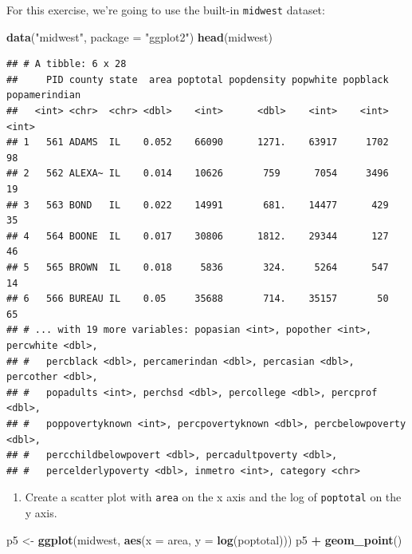 \documentclass[
]{book}
\newenvironment{Shaded}{\begin{snugshade}}{\end{snugshade}}
\newcommand{\DataTypeTok}[1]{\textcolor[rgb]{0.13,0.29,0.53}{#1}}
\newcommand{\KeywordTok}[1]{\textcolor[rgb]{0.13,0.29,0.53}{\textbf{#1}}}
\newcommand{\NormalTok}[1]{#1}
\newcommand{\OperatorTok}[1]{\textcolor[rgb]{0.81,0.36,0.00}{\textbf{#1}}}
\newcommand{\StringTok}[1]{\textcolor[rgb]{0.31,0.60,0.02}{#1}}
\providecommand{\tightlist}{%
  \setlength{\itemsep}{0pt}\setlength{\parskip}{0pt}}
\begin{document}
\begin{alert}

For this exercise, we're going to use the built-in \texttt{midwest} dataset:

\begin{Shaded}
\begin{Highlighting}[]
\KeywordTok{data}\NormalTok{(}\StringTok{"midwest"}\NormalTok{, }\DataTypeTok{package =} \StringTok{"ggplot2"}\NormalTok{)}
\KeywordTok{head}\NormalTok{(midwest)}
\end{Highlighting}
\end{Shaded}

\begin{verbatim}
## # A tibble: 6 x 28
##     PID county state  area poptotal popdensity popwhite popblack popamerindian
##   <int> <chr>  <chr> <dbl>    <int>      <dbl>    <int>    <int>         <int>
## 1   561 ADAMS  IL    0.052    66090      1271.    63917     1702            98
## 2   562 ALEXA~ IL    0.014    10626       759      7054     3496            19
## 3   563 BOND   IL    0.022    14991       681.    14477      429            35
## 4   564 BOONE  IL    0.017    30806      1812.    29344      127            46
## 5   565 BROWN  IL    0.018     5836       324.     5264      547            14
## 6   566 BUREAU IL    0.05     35688       714.    35157       50            65
## # ... with 19 more variables: popasian <int>, popother <int>, percwhite <dbl>,
## #   percblack <dbl>, percamerindan <dbl>, percasian <dbl>, percother <dbl>,
## #   popadults <int>, perchsd <dbl>, percollege <dbl>, percprof <dbl>,
## #   poppovertyknown <int>, percpovertyknown <dbl>, percbelowpoverty <dbl>,
## #   percchildbelowpovert <dbl>, percadultpoverty <dbl>,
## #   percelderlypoverty <dbl>, inmetro <int>, category <chr>
\end{verbatim}

\begin{enumerate}
\def\labelenumi{\arabic{enumi}.}
\tightlist
\item
  Create a scatter plot with \texttt{area} on the x axis and the log of \texttt{poptotal} on the y axis.
\end{enumerate}

\begin{Shaded}
\begin{Highlighting}[]
\NormalTok{p5 \textless{}{-}}\StringTok{ }\KeywordTok{ggplot}\NormalTok{(midwest, }\KeywordTok{aes}\NormalTok{(}\DataTypeTok{x =}\NormalTok{ area, }\DataTypeTok{y =} \KeywordTok{log}\NormalTok{(poptotal))) }
\NormalTok{p5 }\OperatorTok{+}\StringTok{ }\KeywordTok{geom\_point}\NormalTok{() }
\end{Highlighting}
\end{Shaded}


\end{alert}
\end{document}
